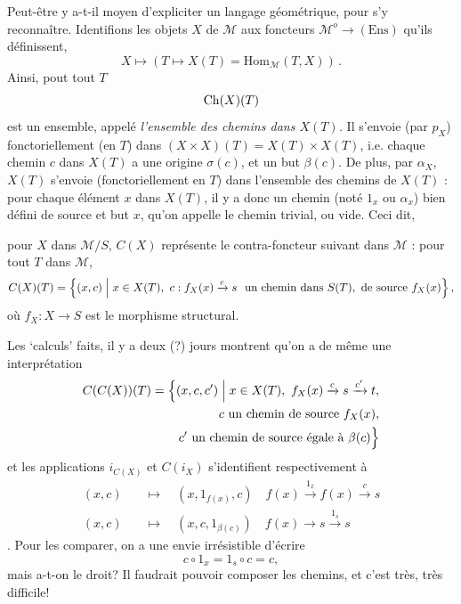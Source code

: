 Peut-être y a-t-il moyen d'expliciter un langage géométrique, pour s'y reconnaître. Identifions les objets $X$ de $\mathcal{M}$ aux foncteurs $\mathcal{M}^o\longrightarrow(\mathrm{Ens})$ qu'ils définissent,
\[
X\longmapsto(T\longmapsto X(T)=\mathrm{Hom}_{\mathcal{M}}(T,X))\,.
\]
Ainsi, pout tout $T$ %
\[
\mathrm{Ch}(X)(T)
\]
est un ensemble, appelé \textit{l'ensemble des chemins dans $X(T)$.} Il s'envoie (par $p_X$) fonctoriellement (en $T$) dans $(X\times X)(T)=X(T)\times X(T)$, i.e. chaque chemin $c$ dans $X(T)$ a une origine $\sigma(c)$, et un but $\beta(c)$. De plus, par $\alpha_X$, $X(T)$ s'envoie (fonctoriellement en $T$) dans l'ensemble des chemins de $X(T)$ : pour chaque élément $x$ dans $X(T)$, il y a donc un chemin (noté $1_x$ ou $\alpha_x$) bien défini de source et but $x$, qu'on appelle le chemin trivial, ou vide. Ceci dit,



pour $X$ dans $\mathcal{M}/S$, $C(X)$ représente le contra-foncteur suivant dans $\mathcal{M}$ : pour tout $T$ dans $\mathcal{M}$,
\[
C(X)(T)=\Bigl\{(x,c)\Bigm| x\in X(T),\ c : f_X(x)\xrightarrow{c}s\ \text{ un chemin dans } S(T), \text{ de source } f_X(x)\Bigr\}\,,
\]
où $f_X : X\longrightarrow S$ est le morphisme structural.

Les ‘calculs’ faits, il y a deux (?) jours montrent qu'on a de même une interprétation
\[
\begin{aligned}
C(C(X))(T)=\Bigl\{(x,c,c')\Bigm| x\in X(T),\ f_X(x)\xrightarrow{c}s\xrightarrow{c'}t,\\
c\text{ un chemin de source } f_X(x),\\
c'\text{ un chemin de source égale à } \beta(c)\Bigr\}
\end{aligned}
\]
et les applications $i_{C(X)}$ et $C(i_X)$ s'identifient respectivement à
\[
\begin{aligned}
(x,c)\quad&\longmapsto\quad(x,1_{f(x)},c)\quad f(x)\xrightarrow{1_x}f(x)\xrightarrow{c}s\\
(x,c)\quad&\longmapsto\quad(x,c,1_{\beta(c)})\quad f(x)\longrightarrow s\xrightarrow{1_s}s
\end{aligned}
\]
. Pour les comparer, on a une envie irrésistible d'écrire
\[
c\circ 1_x=1_s\circ c=c,
\]
mais a-t-on le droit? Il faudrait pouvoir composer les chemins, et c'est très, très difficile!

